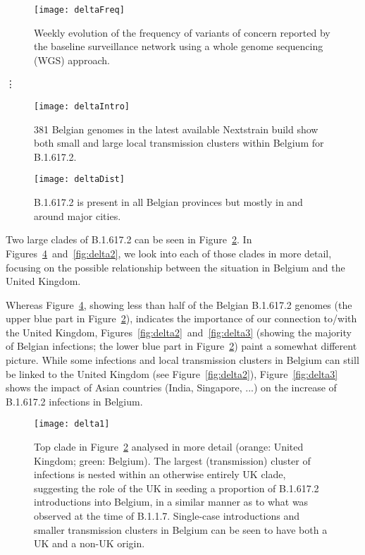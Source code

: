 \begin{figure}[ht]
  \centering
  \texttt{[image: deltaFreq]}
  \caption[Weekly VOCs as of 2021-06-21]{Weekly evolution of the frequency of variants of concern reported by the baseline surveillance network using a whole genome sequencing (WGS) approach.}
  \label{fig:deltaFreq}
\end{figure}

\vdots

\begin{figure}[ht]
  \centering
  \texttt{[image: deltaIntro]}
  \caption[Introductions and local transmission of B.1.617.2]{381 Belgian genomes in the latest available Nextstrain build show both small and large local transmission clusters within Belgium for B.1.617.2.}
  \label{fig:deltaIntro}
\end{figure}

\begin{figure}[ht]
  \centering
  \texttt{[image: deltaDist]}
  \caption[Distribution of Belgian B.1.617.2 sequences]{B.1.617.2 is present in all Belgian provinces but mostly in and around major cities.}
  \label{fig:deltaDist}
\end{figure}

Two large clades of B.1.617.2 can be seen in Figure~\ref{fig:deltaIntro}. In Figures~\ref{fig:delta1}~and~\ref{fig:delta2}, we look into each of those clades in more detail, focusing on the possible relationship between the situation in Belgium and the United Kingdom.

Whereas Figure~\ref{fig:delta1}, showing less than half of the Belgian B.1.617.2 genomes (the upper blue part in Figure~\ref{fig:deltaIntro}), indicates the importance of our connection to/with the United Kingdom, Figures~\ref{fig:delta2}~and~\ref{fig:delta3} (showing the majority of Belgian infections; the lower blue part in Figure~\ref{fig:deltaIntro}) paint a somewhat different picture.
While some infections and local transmission clusters in Belgium can still be linked to the United Kingdom (see Figure~\ref{fig:delta2}), Figure~\ref{fig:delta3} shows the impact of Asian countries (India, Singapore, ...) on the increase of B.1.617.2 infections in Belgium.

\begin{figure}[ht]
  \centering
  \texttt{[image: delta1]}
  \caption[B.1.617.2 clade 1]{Top clade in Figure~\ref{fig:deltaIntro} analysed in more detail (orange: United Kingdom; green: Belgium). The largest (transmission) cluster of infections is nested within an otherwise entirely UK clade, suggesting the role of the UK in seeding a proportion of B.1.617.2 introductions into Belgium, in a similar manner as to what was observed at the time of B.1.1.7. Single-case introductions and smaller transmission clusters in Belgium can be seen to have both a UK and a non-UK origin.}
  \label{fig:delta1}
\end{figure}

